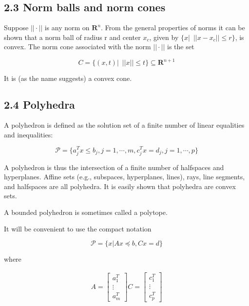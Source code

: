 \documentclass{article}
\begin{document}
\subsection*{2.3 Norm balls and norm cones}

Suppose $||\cdot||$ is any norm on $\mathbf{R}^n$. From the general properties of norms it
can be shown that a norm ball of radius r and center $x_c$, given by $\{x|\enspace ||x-x_c||\le r\}$,
is convex. The norm cone associated with the norm $||\cdot||$ is the set

\[
C=\{(x,t)|\enspace ||x||\le t\} \subseteq \mathbf{R}^{n+1}    
\]

It is (as the name suggests) a convex cone.

\subsection*{2.4 Polyhedra}

A polyhedron is defined as the solution set of a finite number of linear equalities
and inequalities:

\[
\mathcal{P}=\{a_j^Tx\le b_j, j=1,\cdots,m, c^T_jx=d_j, j=1,\cdots,p\}   
\]

A polyhedron is thus the intersection of a finite number of halfspaces and hyperplanes.
Affine sets (e.g., subspaces, hyperplanes, lines), rays, line segments, and
halfspaces are all polyhedra. It is easily shown that polyhedra are convex sets.

A bounded polyhedron is sometimes called a polytope.

It will be convenient to use the compact notation

\[
\mathcal{P}=\{x|Ax\preceq b,Cx=d\}    
\]

where

\begin{equation*}
    \begin{split}
        A=
        \begin{bmatrix}
          a_1^T\\
          \vdots\\
          a_m^T  
        \end{bmatrix}   
        C=
        \begin{bmatrix}
          c_1^T\\
          \vdots\\
          c_p^T  
        \end{bmatrix}             
    \end{split}
\end{equation*}
\end{document}

